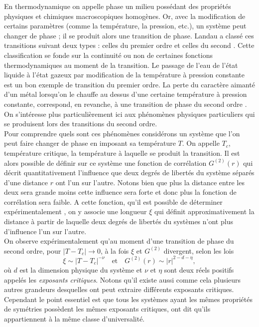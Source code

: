\documentclass[10pt]{article}
\begin{document}
\begin{multicols}{2}
En thermodynamique on appelle phase un milieu possédant des propriétés physiques et chimiques macroscopiques homogènes. Or, avec la modification de certains paramètres (comme la température, la pression, etc.), un système peut changer de phase ; il se produit alors une transition de phase. Landau a classé ces transitions suivant deux types : celles du premier ordre et celles du second \cite{toledano1987landau}. Cette classification se fonde sur la continuité ou non de certaines fonctions thermodynamiques au moment de la transition. 
Le passage de l'eau de l'état liquide à l'état gazeux par modification de la température à pression constante est un bon exemple \cite{} de transition du premier ordre. La perte du caractère aimanté d'un métal lorsqu'on le chauffe au dessus d'une certaine température à pression constante, correspond, en revanche, à une transition de phase du second ordre \cite{kochmanski2013curie}. On s'intéresse plus particulièrement ici aux phénomènes physiques particuliers qui se produisent lors des transitions du second ordre. \\

Pour comprendre quels sont ces phénomènes considérons un système que l'on peut faire changer de phase en imposant sa température $T$. On appelle $T_c$, température critique, la température à laquelle se produit la transition. Il est alors possible de définir sur ce système une fonction de corrélation $G^{(2)}(r)$ qui décrit quantitativement l'influence que deux degrés de libertés du système séparés d'une distance $r$ ont l'un sur l'autre. Notons bien que plus la distance entre les deux sera grande moins cette influence sera forte et donc plus la fonction de corrélation sera faible. A cette fonction, qu'il est possible de déterminer expérimentalement \cite{Bellac2012}, on y associe une longueur $\xi$ qui définit approximativement la distance à partir de laquelle deux degrés de libertés du systèmes n'ont plus d'influence l'un sur l'autre.\\

On observe expérimentalement qu'au moment d'une transition de phase du second ordre, pour $|T-T_c| \rightarrow 0$, à la fois $\xi$ et $G^{(2)}$ divergent, selon les lois 
\begin{equation}
	\xi \sim |T-T_c|^{-\nu} 	\quad \text{et} \quad G^{(2)}(r) \sim |r|^{2-d-\eta},
\end{equation}
où $d$ est la dimension physique du système et $\nu$ et $\eta$ sont deux réels positifs appelés les \emph{exposants critiques}. Notons qu'il existe aussi comme cela plusieurs autres grandeurs desquelles ont peut extraire différents exposants critiques. Cependant le point essentiel est que tous les systèmes ayant les mêmes propriétés de symétries possèdent les mêmes exposants critiques, ont dit qu'ils appartiennent à la même classe d'universalité.\\



\end{multicols}
\end{document}

